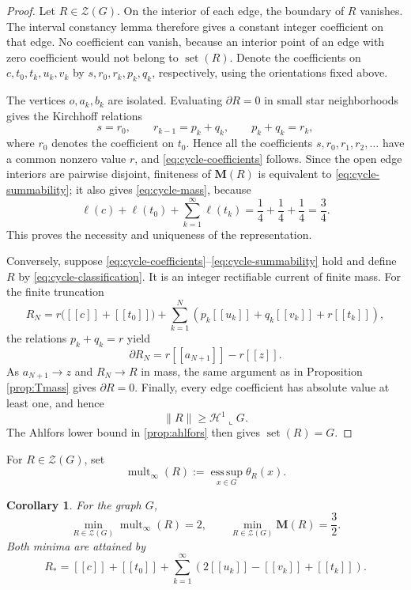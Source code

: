 \documentclass[11pt]{article}
\newtheorem{corollary}[theorem]{Corollary}
\theoremstyle{remark}
\newcommand{\M}{\mathbf M}
\newcommand{\Hh}{\mathcal H}
\newcommand{\set}{\operatorname{set}}
\newcommand{\llbracket}{[\![}
\newcommand{\rrbracket}{]\!]}
\begin{document}
\begin{proof}
Let $R\in\mathscr Z(G)$. On the interior of each edge, the boundary of $R$ vanishes. The interval constancy lemma therefore gives a constant integer coefficient on that edge. No coefficient can vanish, because an interior point of an edge with zero coefficient would not belong to $\set(R)$. Denote the coefficients on $c,t_0,t_k,u_k,v_k$ by $s,r_0,r_k,p_k,q_k$, respectively, using the orientations fixed above.

The vertices $o,a_k,b_k$ are isolated. Evaluating $\partial R=0$ in small star neighborhoods gives the Kirchhoff relations
\[
       s=r_0,
       \qquad
       r_{k-1}=p_k+q_k,
       \qquad
       p_k+q_k=r_k,
\]
where $r_{0}$ denotes the coefficient on $t_0$. Hence all the coefficients $s,r_0,r_1,r_2,\ldots$ have a common nonzero value $r$, and \eqref{eq:cycle-coefficients} follows. Since the open edge interiors are pairwise disjoint, finiteness of $\M(R)$ is equivalent to \eqref{eq:cycle-summability}; it also gives \eqref{eq:cycle-mass}, because
\[
 \ell(c)+\ell(t_0)+\sum_{k=1}^{\infty}\ell(t_k)
 =\frac14+\frac14+\frac14=\frac34.
\]
This proves the necessity and uniqueness of the representation.

Conversely, suppose \eqref{eq:cycle-coefficients}--\eqref{eq:cycle-summability} hold and define $R$ by \eqref{eq:cycle-classification}. It is an integer rectifiable current of finite mass. For the finite truncation
\[
 R_N=r\bigl(\llbracket c\rrbracket+\llbracket t_0\rrbracket\bigr)
 +\sum_{k=1}^{N}
   \left(p_k\llbracket u_k\rrbracket
        +q_k\llbracket v_k\rrbracket
        +r\llbracket t_k\rrbracket\right),
\]
the relations $p_k+q_k=r$ yield
\[
       \partial R_N
       =r\llbracket a_{N+1}\rrbracket-r\llbracket z\rrbracket.
\]
As $a_{N+1}\to z$ and $R_N\to R$ in mass, the same argument as in Proposition \ref{prop:Tmass} gives $\partial R=0$. Finally, every edge coefficient has absolute value at least one, and hence
\[
       \|R\|\ge\Hh^1\llcorner G.
\]
The Ahlfors lower bound in \cref{prop:ahlfors} then gives $\set(R)=G$.
\end{proof}

For $R\in\mathscr Z(G)$, set
\[
       \operatorname{mult}_{\infty}(R)
       :=\operatorname*{ess\,sup}_{x\in G}\theta_R(x).
\]

\begin{corollary}\label{cor:sharp-cycle}
For the graph $G$,
\[
 \min_{R\in\mathscr Z(G)}\operatorname{mult}_{\infty}(R)=2,
 \qquad
 \min_{R\in\mathscr Z(G)}\M(R)=\frac32.
\]
Both minima are attained by
\begin{equation}\label{eq:Rstar}
 R_*=\llbracket c\rrbracket+\llbracket t_0\rrbracket
 +\sum_{k=1}^{\infty}
   \left(2\llbracket u_k\rrbracket
        -\llbracket v_k\rrbracket
        +\llbracket t_k\rrbracket\right).
\end{equation}
\end{corollary}
\end{document}
